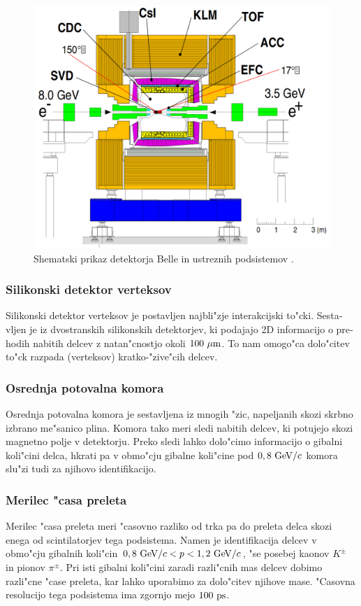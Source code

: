 \begin{otherlanguage}{slovene}
\begin{figure}[H]
	\centering
	\captionsetup{width=0.8\linewidth}
	\includegraphics[width=0.8\linewidth]{fig/setup/Belle_detector}
	\caption{Shematski prikaz detektorja Belle in ustreznih podsistemov \cite{ABASHIAN2002117}.}
	\label{fig:bdet_si}
\end{figure}

\subsubsection{Silikonski  detektor verteksov}
Silikonski detektor verteksov je postavljen najbli"zje interakcijski to"cki. Sestavljen je iz dvostranskih silikonskih detektorjev, ki podajajo 2D informacijo o prehodih nabitih delcev z natan"cnostjo okoli $100\mathrm{~\mu m}$. To nam omogo"ca dolo"citev to"ck razpada (verteksov) kratko-"zive"cih delcev.

\subsubsection{Osrednja potovalna komora}
Osrednja potovalna komora je sestavljena iz mnogih "zic, napeljanih skozi skrbno izbrano me"sanico plina. Komora tako meri sledi nabitih delcev, ki potujejo skozi magnetno polje v detektorju. Preko sledi lahko dolo"cimo informacijo o gibalni koli"cini delca, hkrati pa v obmo"cju gibalne koli"cine pod $0,8\mathrm{~GeV}/c$ komora slu"zi tudi za njihovo identifikacijo.

\subsubsection{Merilec "casa preleta}
Merilec "casa preleta meri "casovno razliko od trka pa do preleta delca skozi enega od scintilatorjev tega podsistema. Namen je identifikacija delcev v obmo"cju gibalnih koli"cin $0,8\mathrm{~GeV}/c < p < 1,2\mathrm{~GeV}/c$, "se posebej kaonov $K^\pm$ in pionov $\pi^\pm$. Pri isti gibalni koli"cini zaradi razli"cnih mas delcev dobimo razli"cne "case preleta, kar lahko uporabimo za dolo"citev njihove mase. "Casovna resolucijo tega podsistema ima zgornjo mejo $100\mathrm{~ps}$.


\end{otherlanguage}
